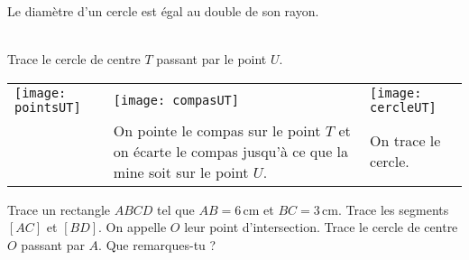  \begin{remarque}
 Le diamètre d'un cercle est égal au double de son rayon.
  \end{remarque}

\newpage

\begin{methode*1}

 \begin{exemple*1} \\[0.75em]
Trace le cercle de centre $T$ passant par le point $U$. \\[0.5em]

\begin{tabularx}{\linewidth}{X|X|X}
 \texttt{[image: pointsUT]} &  \texttt{[image: compasUT]} & \texttt{[image: cercleUT]} \\ 
  & \multicolumn{1}{|p{3cm}|}{On pointe le compas sur le point $T$ et on écarte le compas jusqu'à ce que la mine soit sur le point $U$.} & On trace le cercle. \\
\end{tabularx} 

 \end{exemple*1}

\exercice 

Trace un rectangle $ABCD$ tel que $AB=6$\,cm et $BC=3$\,cm. Trace les segments $[AC]$ et $[BD]$. On appelle $O$ leur point d'intersection. Trace le cercle de centre $O$ passant par $A$. Que remarques-tu ?


 
\end{methode*1}




